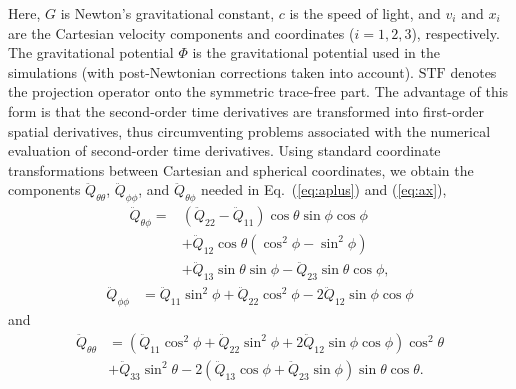 Here, $G$ is Newton's gravitational constant, $c$ is the speed of
light, and $v_i$ and $x_i$ are the Cartesian velocity components and
coordinates ($i = 1,2,3$), respectively. The gravitational potential
$\Phi$ is the gravitational potential used in the simulations (with post-Newtonian
corrections taken into account). $\mathrm{STF}$ denotes the projection operator
onto the symmetric trace-free part.
The advantage of this form is that
the second-order time derivatives are transformed into first-order
spatial derivatives, thus circumventing problems associated with the
numerical evaluation of second-order time derivatives. 
Using standard
coordinate transformations between Cartesian and spherical
coordinates, we obtain \citep{oohara_97,nakamura_87} the components 
$\ddot{Q}_{\theta \theta}$, $\ddot{Q}_{\phi \phi}$, and
$\ddot{Q}_{\theta \phi}$ needed in Eq.~(\ref{eq:aplus}) and (\ref{eq:ax}),
\begin{eqnarray}
\label{eq:qtp}
\ddot{Q}_{\theta \phi} =&  \left (\ddot{Q}_{22} - \ddot{Q}_{11} \right ) \cos{\theta}\sin{\phi}\cos{\phi} \nonumber \\
&+ \ddot{Q}_{12} \cos{\theta} \left (\cos^2 \phi - \sin^2 \phi \right ) \nonumber \\ 
&+ \ddot{Q}_{13} \sin \theta \sin \phi - \ddot{Q}_{23} \sin \theta \cos\phi,
\end{eqnarray}
\begin{eqnarray}
\ddot{Q}_{\phi \phi} &= \ddot{Q}_{11} \sin^2 \phi + \ddot{Q}_{22} \cos^2 \phi - 2 \ddot{Q}_{12} \sin{\phi}\cos{\phi}
\end{eqnarray}
and
\begin{eqnarray}
\ddot{Q}_{\theta \theta} &= \left ( \ddot{Q}_{11} \cos^2 \phi + \ddot{Q}_{22} \sin^2 \phi +  2 \ddot{Q}_{12} \sin{\phi} \cos{\phi} \right) \cos^2 \theta \nonumber \\
&+ \ddot{Q}_{33} \sin^2 \theta - 2 \left (\ddot{Q}_{13} \cos{\phi} + \ddot{Q}_{23} \sin{\phi} \right ) \sin{\theta} \cos{\theta}. 
\end{eqnarray}

